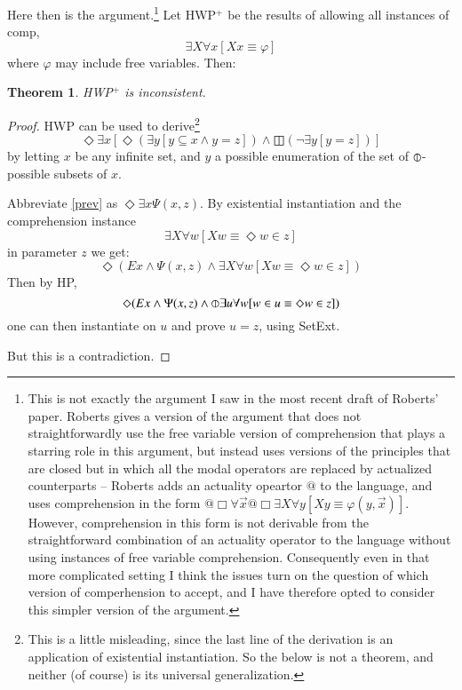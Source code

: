 \documentclass{article}
\newtheorem{theorem}{Theorem}
\begin{document}
Here then is the argument.\footnote{
    This is not exactly the argument I saw in the most recent draft of Roberts'
    paper. Roberts gives a version of the argument that does not straightforwardly 
    use the free variable version of comprehension that plays a starring role 
    in this argument, but instead uses versions of the principles that are closed 
    but in which all the modal operators are replaced by actualized counterparts -- 
    Roberts adds an actuality opeartor $@$ to the language, and uses comprehension 
    in the form $@\Box \forall \vec{x} @\Box \exists X \forall y[Xy \equiv \varphi(y, \vec{x})]$.
    However, comprehension in this form is not derivable from the straightforward 
    combination of an actuality operator to the language without using instances 
    of free variable comprehension. Consequently even in that more complicated setting 
    I think the issues turn on the question of which version of comperhension to accept,
    and I have therefore opted to consider this simpler version of the argument.
} Let HWP$^+$ be the 
results of allowing all instances of comp, 
\[ \exists X \forall x[Xx \equiv \varphi]\]
where $\varphi$ may include free variables. Then:
\begin{theorem}
    HWP$^+$ is inconsistent.
\end{theorem}
\begin{proof}
    HWP can be used to derive\footnote{This is a little misleading, since the last line 
    of the derivation is an application of existential instantiation. So the below is not 
    a theorem, and neither (of course) is its universal generalization.}
    \begin{equation}\label{prev}
        \Diamond \exists x[\Diamond (\exists y[ y \subseteq x \wedge y = z]) \wedge \boxbar(\neg \exists y[y = z])]
    \end{equation}
    by letting $x$ be any infinite set, and $y$ a possible enumeration of the 
    set of $\circledbar$-possible subsets of $x$.

    Abbreviate \eqref{prev} as $\Diamond \exists x \Psi(x, z)$. By 
    existential instantiation and the comprehension instance
    \begin{equation}\label{exa}
        \exists X \forall w[Xw \equiv \Diamond w \in z]
    \end{equation}
    in parameter $z$ we get:
    \begin{equation}\label{exb}
        \Diamond (Ex \wedge \Psi(x, z) \wedge \exists X \forall w[Xw \equiv \Diamond w \in z])
    \end{equation}
    Then by HP, 
    \begin{equation}\label{exc}
        \Diamond (Ex \wedge \Psi(x, z) \wedge \circledbar \exists u \forall w[w \in u \equiv \Diamond w \in z])
    \end{equation}
    one can then instantiate on $u$ and prove $u = z$, using SetExt.

    But this is a contradiction.

\end{proof}
\end{document}
